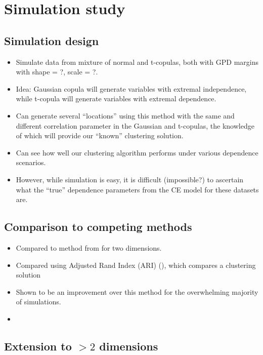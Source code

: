 \documentclass{article}
\numberwithin{equation}{section}
\begin{document}
\section{Simulation study}\label{sec:sim}

\subsection{Simulation design}

\begin{itemize}
    \item Simulate data from mixture of normal and t-copulas, both with GPD margins with shape = ?, scale = ?.
    \item Idea: Gaussian copula will generate variables with extremal independence, while t-copula will generate variables with extremal dependence. 
    \item Can generate several ``locations'' using this method with the same and different correlation parameter in the Gaussian and t-copulas, the knowledge of which will provide our ``known'' clustering solution. 
    \item Can see how well our clustering algorithm performs under various dependence scenarios.
    \item However, while simulation is easy, it is difficult (impossible?) to ascertain what the ``true'' dependence parameters from the CE model for these datasets are. 
\end{itemize}

\subsection{Comparison to competing methods}

\begin{itemize}
    \item Compared to method from \cite{Vignotto2021} for two dimensions. 
    \item Compared using Adjusted Rand Index (ARI) (), which compares a clustering solution
    \item Shown to be an improvement over this method for the overwhelming majority of simulations. 
    \item {}
\end{itemize}

\subsection{Extension to $>2$ dimensions}
\end{document}
